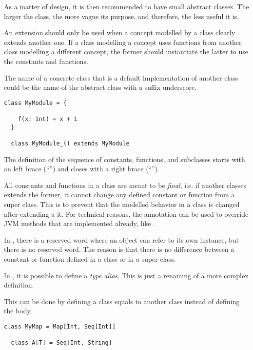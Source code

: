 As a matter of design, it is then recommended to have small abstract classes.
The larger the class, the more vague its purpose, and therefore, the less useful it is.

An extension should only be used when a concept modelled by a class clearly extends another one.
If a class modelling a concept uses functions from another class modelling a different concept, the former should instantiate the latter to use the constants and functions.

The name of a concrete class that is a default implementation of another class could be the name of the abstract class with a suffix underscore.

\begin{lstlisting}[label={lst:exampleDefaultImplementation}]
  class MyModule = {

    f(x: Int) = x + 1
  }

  class MyModule_() extends MyModule
\end{lstlisting}

The definition of the sequence of constants, functions, and subclasses starts with an left brace (``\srccode{\{}'') and closes with a right brace (``\srccode{\}}'').

All constants and functions in a class are meant to be \textit{final}, i.e. if another classes extends the former, it cannot change any defined constant or function from a super class.
This is to prevent that the modelled behavior in a class is changed after extending a it.
For technical reasons, the annotation \soverride can be used to override JVM methods that are implemented already, like .

In \Soda, there is a \sthis reserved word where an object can refer to its own instance, but there is no \scalasuper reserved word.
The reason is that there is no difference between a constant or function defined in a class or in a super class.

In \Soda, it is possible to define a \textit{type alias}.
This is just a renaming of a more complex definition.

This can be done by defining a class equals to another class instead of defining the body.

\begin{lstlisting}[label={lst:exampleTypeAlias}]
  class MyMap = Map[Int, Seq[Int]]

  class A[T] = Seq[Int, String]
\end{lstlisting}


